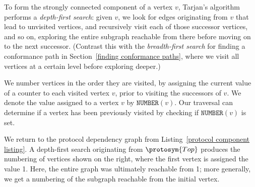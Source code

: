 \documentclass[../generics]{subfiles}
\begin{document}
\newcommand{\Number}[1]{\texttt{NUMBER}(#1)}
\newcommand{\Lowlink}[1]{\texttt{LOWLINK}(#1)}
\newcommand{\OnStack}[1]{\texttt{ONSTACK}(#1)}

To form the strongly connected component of a vertex $v$, Tarjan's algorithm performs a \emph{depth-first search}: given $v$, we look for edges originating from $v$ that lead to unvisited vertices, and recursively visit each of those successor vertices, and so on, exploring the entire subgraph reachable from there before moving on to the next successor. (Contrast this with the \emph{breadth-first search} for finding a conformance path in Section~\ref{finding conformance paths}, where we visit all vertices at a certain level before exploring deeper.)

\begin{wrapfigure}[11]{r}{2.9cm}
\end{wrapfigure}

We number vertices in the order they are visited, by assigning the current value of a counter to each visited vertex $v$, prior to visiting the successors of $v$. We denote the value assigned to a vertex $v$ by $\Number{v}$. Our traversal can determine if a vertex has been previously visited by checking if $\Number{v}$ is set.

We return to the protocol dependency graph from Listing~\ref{protocol component listing}. A depth-first search originating from $\protosym{Top}$ produces the numbering of vertices shown on the right, where the first vertex is assigned the value 1. Here, the entire graph was ultimately reachable from 1; more generally, we get a numbering of the subgraph reachable from the initial vertex.
\end{document}
